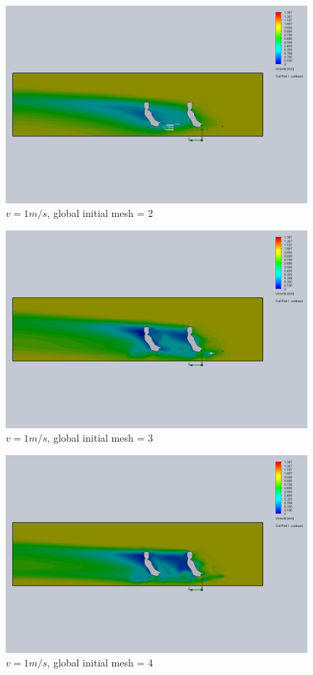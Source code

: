 \documentclass[11pt]{article}
\begin{document}
\begin{figure}
\includegraphics[width=\textwidth]{gm_2_rf_7_v01.png}
\caption{$v = 1 m/s$, global initial mesh = 2}
\end{figure}

\begin{figure}
\includegraphics[width=\textwidth]{gm_3_rf_7_v01.png}
\caption{$v = 1 m/s$, global initial mesh = 3}
\end{figure}

\begin{figure}
\includegraphics[width=\textwidth]{gm_4_rf_7_v01.png}
\caption{$v = 1 m/s$, global initial mesh = 4}
\end{figure}
\end{document}

